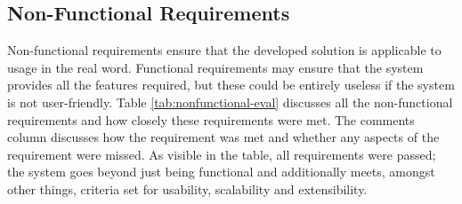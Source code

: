 \subsection{Non-Functional Requirements}
Non-functional requirements ensure that the developed solution is applicable to usage in the real word. Functional requirements may ensure that the system provides all the features required, but these could be entirely useless if the system is not user-friendly. Table \ref{tab:nonfunctional-eval} discusses all the non-functional requirements and how closely these requirements were met. The comments column discusses how the requirement was met and whether any aspects of the requirement were missed. As visible in the table, all requirements were passed; the system goes beyond just being functional and additionally meets, amongst other things, criteria set for usability, scalability and extensibility.

